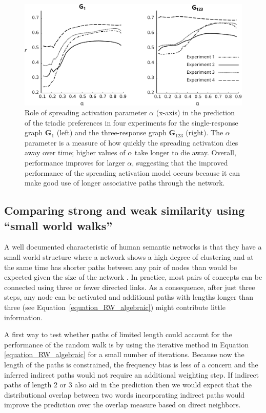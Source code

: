 \documentclass[doc]{apa6}
\begin{document}
\begin{figure}[ht]
\centering
\includegraphics[width=14cm]{images/alphaPlot3.pdf}
\caption{\small{Role of spreading activation parameter $\alpha$ (x-axis) in the prediction of the triadic preferences in four experiments for the single-response graph $\mathbf{G}_{1}$ (left) and the three-response graph $\mathbf{G}_{123}$ (right). The $\alpha$ parameter is a measure of how quickly the spreading activation dies away over time; higher values of $\alpha$ take longer to die away. Overall, performance improves for larger $\alpha$, suggesting that the improved performance of the spreading activation model occurs because it can make good use of longer associative paths through the network.}}
\label{fig:alphaPlot}
\end{figure}




\subsection{Comparing strong and weak similarity using ``small world walks''}
A well documented characteristic of human semantic networks is that they have a small world structure where a network shows a high degree of clustering and at the same time has shorter paths between any pair of nodes  than would be expected given the size of the network \parencite{DeDeyne2008b,Steyvers2005}. In practice, most pairs of concepts can be connected using three or fewer directed links. As a consequence, after just three steps, any node can be activated and additional paths with lengths longer than three (see Equation~\ref{equation_RW_algebraic}) might contribute little information.

A first way to test whether paths of limited length could account for the performance of the random walk is by using the iterative method in Equation \ref{equation_RW_algebraic} for a small number of iterations. Because now the length of the paths is constrained, the frequency bias is less of a concern and the inferred indirect paths would not require an additional weighting step. If indirect paths of length 2 or 3 also aid in the prediction then we would expect that the distributional overlap between two words incorporating indirect paths would improve the prediction over the overlap measure based on direct neighbors.
\end{document}

